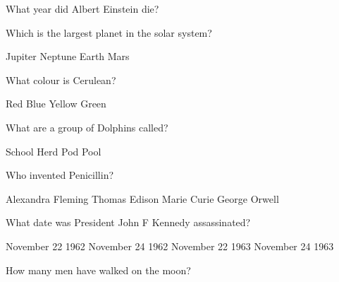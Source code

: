 \documentclass[a4paper]{article}
\begin{document}
\begin{mcquestions}
 
 
 
\question What year did Albert Einstein die?

          \begin{mcanswerslist}[ordinal]
          \end{mcanswerslist}



\question Which is the largest planet in the solar system?

          \begin{mcanswerslist}
          \answer[correct] Jupiter
          \answer Neptune
          \answer Earth
          \answer Mars
          \end{mcanswerslist}


\question What colour is Cerulean?

          \begin{mcanswerslist}
          \answer Red
          \answer[correct] Blue
          \answer Yellow
          \answer Green
          \end{mcanswerslist}
          
\question What are a group of Dolphins called?

          \begin{mcanswerslist}
          \answer School
          \answer Herd
          \answer[correct] Pod
          \answer Pool
          \end{mcanswerslist}

\question Who invented Penicillin?

          \begin{mcanswerslist}
          \answer[correct] Alexandra Fleming
          \answer Thomas Edison
          \answer Marie Curie
          \answer George Orwell
          \end{mcanswerslist}

\question What date was President John F Kennedy assassinated?

          \begin{mcanswerslist}[{1,2,3,4},{1,3,2,4},{4,3,2,1},{4,2,3,1}]
          \answer November 22 1962
          \answer November 24 1962
          \answer[correct] November 22 1963
          \answer November 24 1963
          
          \end{mcanswerslist}

\question How many men have walked on the moon?


\end{mcquestions}
\end{document}

